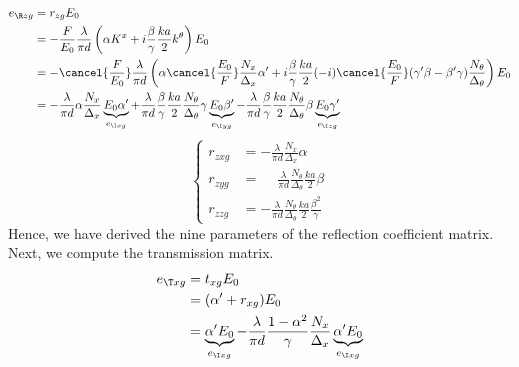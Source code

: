 \begin{refsection}
\begin{align*}
    e_{\R zg} &= r_{zg} E_0
    \\
    &=
    -
    \frac{F}{E_0}
    \frac{\lambda}{\pi d}
    \left(
        \alpha K^x
        +
        i
        \frac{\beta}{\gamma}
        \frac{ka}{2}
        k^\theta
    \right)
    E_0
    \\
    &=
    -
    \cancel{\frac{F}{E_0}}
    \frac{\lambda}{\pi d}
    \left(
        \alpha
        \cancel{\frac{E_0}{F}}
        \frac{N_x}{\Delta_x}
        \alpha'
        +
        i
        \frac{\beta}{\gamma}
        \frac{ka}{2}
        (-i)
        \cancel{\frac{E_0}{F}}
        (\gamma' \beta - \beta' \gamma)
        \frac{N_\theta}{\Delta_\theta}
    \right)
    E_0
    \\
    &=
    -
    \frac{\lambda}{\pi d}
    \alpha
    \frac{N_x}{\Delta_x}
    \underbrace{E_0 \alpha'}_{e_{\I xg}}
    +
    \frac{\lambda}{\pi d}
    \frac{\beta}{\gamma}
    \frac{ka}{2}
    \frac{N_\theta}{\Delta_\theta}
    \gamma
    \underbrace{E_0 \beta'}_{e_{\I yg}}
    -
    \frac{\lambda}{\pi d}
    \frac{\beta}{\gamma}
    \frac{ka}{2}
    \frac{N_\theta}{\Delta_\theta}
    \beta
    \underbrace{E_0 \gamma'}_{e_{\I zg}}
\end{align*}
\begin{equation}
    \left\lbrace
    \begin{aligned}
        r_{zxg}
        &=
        -
        \frac{\lambda}{\pi d}
        \frac{N_x}{\Delta_x}
        \alpha
        \\
        r_{zyg}
        &=
        \phantom{-}
        \frac{\lambda}{\pi d}
        \frac{N_\theta}{\Delta_\theta}
        \frac{ka}{2}
        \beta
        \\
        r_{zzg}
        &=
        -
        \frac{\lambda}{\pi d}
        \frac{N_\theta}{\Delta_\theta}
        \frac{ka}{2}
        \frac{\beta^2}{\gamma}
    \end{aligned}
    \right.
\end{equation}
Hence, we have derived the nine parameters of the reflection coefficient matrix.
Next, we compute the transmission matrix.
\begin{align*}
    e_{\T xg} &= t_{xg} E_0
    \\
    &= (\alpha' + r_{xg}) E_0
    \\
    &= \underbrace{\alpha' E_0}_{e_{\I xg}}
       -
       \frac{\lambda}{\pi d}
       \frac{1 - \alpha^2}{\gamma}
       \frac{N_x}{\Delta_x}
       \underbrace{\alpha' E_0}_{e_{\I xg}}
    \\

\end{align*}
\end{refsection}

